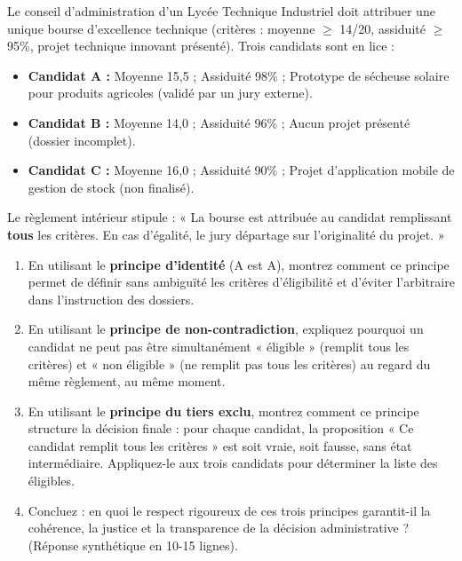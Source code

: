 \documentclass[11pt]{article}
\newcommand{\cle}[1]{{\popxbold\color{popdark}#1}}
\begin{document}
\begin{exercice}
Le conseil d'administration d'un Lycée Technique Industriel doit attribuer une unique bourse d'excellence technique (critères : moyenne $\ge$ 14/20, assiduité $\ge$ 95\%, projet technique innovant présenté). Trois candidats sont en lice :
\begin{itemize}
    \item \textbf{Candidat A :} Moyenne 15,5 ; Assiduité 98\% ; Prototype de sécheuse solaire pour produits agricoles (validé par un jury externe).
    \item \textbf{Candidat B :} Moyenne 14,0 ; Assiduité 96\% ; Aucun projet présenté (dossier incomplet).
    \item \textbf{Candidat C :} Moyenne 16,0 ; Assiduité 90\% ; Projet d'application mobile de gestion de stock (non finalisé).
\end{itemize}
Le règlement intérieur stipule : « La bourse est attribuée au candidat remplissant \textbf{tous} les critères. En cas d'égalité, le jury départage sur l'originalité du projet. »

\begin{enumerate}
    \item En utilisant le \textbf{principe d'identité} (A est A), montrez comment ce principe permet de définir sans ambiguïté les critères d'éligibilité et d'éviter l'arbitraire dans l'instruction des dossiers.
    \item En utilisant le \textbf{principe de non-contradiction}, expliquez pourquoi un candidat ne peut pas être simultanément « éligible » (remplit tous les critères) et « non éligible » (ne remplit pas tous les critères) au regard du même règlement, au même moment.
    \item En utilisant le \textbf{principe du tiers exclu}, montrez comment ce principe structure la décision finale : pour chaque candidat, la proposition « Ce candidat remplit tous les critères » est soit vraie, soit fausse, sans état intermédiaire. Appliquez-le aux trois candidats pour déterminer la liste des éligibles.
    \item Concluez : en quoi le respect rigoureux de ces trois principes garantit-il la \cle{cohérence}, la \cle{justice} et la \cle{transparence} de la décision administrative ? (Réponse synthétique en 10-15 lignes).
\end{enumerate}
\end{exercice}

\newpage
\end{document}
